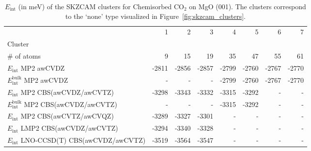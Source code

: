 \begin{table}
\caption{\label{tab:system_eint_mgo_co2_chemisorbed}$E_\textrm{int}$ (in meV) of the SKZCAM clusters for Chemisorbed CO$_2$ on MgO (001). The clusters correspond to the `none' type visualized in Figure~\ref{fig:skzcam_clusters}.}
\begin{adjustbox}{center,max width=1.4\textwidth}
\begin{tabular}{lrrrrrrr}
\toprule
 & 1 & 2 & 3 & 4 & 5 & 6 & 7 \\ 
Cluster &  &  &  &  &  &  &  \\
\midrule
\# of atoms & 9 & 15 & 19 & 35 & 47 & 55 & 61 \\
$E_\textrm{int}$ MP2 awCVDZ & -2811 & -2856 & -2857 & -2799 & -2760 & -2767 & -2770 \\
$E_\textrm{int}^\textrm{bulk}$ MP2 awCVDZ & - & - & - & -2799 & -2760 & -2767 & -2770 \\
$E_\textrm{int}$ MP2 CBS(awCVDZ/awCVTZ) & -3298 & -3343 & -3332 & -3315 & -3292 & - & - \\
$E_\textrm{int}^\textrm{bulk}$ MP2 CBS(awCVDZ/awCVTZ) & - & - & - & -3315 & -3292 & - & - \\
$E_\textrm{int}$ MP2 CBS(awCVTZ/awCVQZ) & -3289 & -3327 & -3301 & - & - & - & - \\
$E_\textrm{int}$ LMP2 CBS(awCVDZ/awCVTZ) & -3294 & -3340 & -3328 & - & - & - & - \\
$E_\textrm{int}$ LNO-CCSD(T) CBS(awCVDZ/awCVTZ) & -3519 & -3564 & -3547 & - & - & - & - \\
\bottomrule
\end{tabular}
\end{adjustbox}
\end{table}

